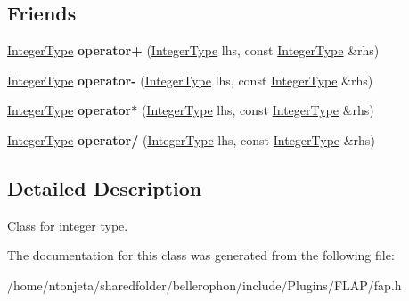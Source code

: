 \subsection*{Friends}
\begin{DoxyCompactItemize}
\item 
\hypertarget{classfap_1_1IntegerType_ab5d184366bb718da845cd767865da61b}{}\label{classfap_1_1IntegerType_ab5d184366bb718da845cd767865da61b} 
\hyperlink{classfap_1_1IntegerType}{Integer\+Type} {\bfseries operator+} (\hyperlink{classfap_1_1IntegerType}{Integer\+Type} lhs, const \hyperlink{classfap_1_1IntegerType}{Integer\+Type} \&rhs)
\item 
\hypertarget{classfap_1_1IntegerType_a398e1d696e8eeb50208c855abd492088}{}\label{classfap_1_1IntegerType_a398e1d696e8eeb50208c855abd492088} 
\hyperlink{classfap_1_1IntegerType}{Integer\+Type} {\bfseries operator-\/} (\hyperlink{classfap_1_1IntegerType}{Integer\+Type} lhs, const \hyperlink{classfap_1_1IntegerType}{Integer\+Type} \&rhs)
\item 
\hypertarget{classfap_1_1IntegerType_ad70b97ca16a41669c7da478d22d8c43f}{}\label{classfap_1_1IntegerType_ad70b97ca16a41669c7da478d22d8c43f} 
\hyperlink{classfap_1_1IntegerType}{Integer\+Type} {\bfseries operator$\ast$} (\hyperlink{classfap_1_1IntegerType}{Integer\+Type} lhs, const \hyperlink{classfap_1_1IntegerType}{Integer\+Type} \&rhs)
\item 
\hypertarget{classfap_1_1IntegerType_a4879249fce29faf02fa86b39c0301304}{}\label{classfap_1_1IntegerType_a4879249fce29faf02fa86b39c0301304} 
\hyperlink{classfap_1_1IntegerType}{Integer\+Type} {\bfseries operator/} (\hyperlink{classfap_1_1IntegerType}{Integer\+Type} lhs, const \hyperlink{classfap_1_1IntegerType}{Integer\+Type} \&rhs)
\end{DoxyCompactItemize}


\subsection{Detailed Description}
Class for integer type. 

The documentation for this class was generated from the following file\+:\begin{DoxyCompactItemize}
\item 
/home/ntonjeta/sharedfolder/bellerophon/include/\+Plugins/\+F\+L\+A\+P/fap.\+h\end{DoxyCompactItemize}
